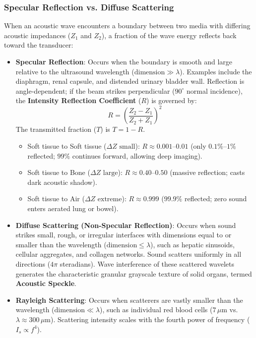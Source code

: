 \documentclass[11pt,a4paper]{article}
\begin{document}
\subsubsection{Specular Reflection vs. Diffuse Scattering}
When an acoustic wave encounters a boundary between two media with differing acoustic impedances ($Z_1$ and $Z_2$), a fraction of the wave energy reflects back toward the transducer:
\begin{itemize}[leftmargin=*]
    \item \textbf{Specular Reflection}: Occurs when the boundary is smooth and large relative to the ultrasound wavelength ($\text{dimension} \gg \lambda$). Examples include the diaphragm, renal capsule, and distended urinary bladder wall. Reflection is angle-dependent; if the beam strikes perpendicular ($90^\circ$ normal incidence), the \textbf{Intensity Reflection Coefficient} ($R$) is governed by:
    \begin{equation}
        R = \left(\frac{Z_2 - Z_1}{Z_2 + Z_1}\right)^2
    \end{equation}
    The transmitted fraction ($T$) is $T = 1 - R$.
    \begin{itemize}
        \item Soft tissue to Soft tissue ($\Delta Z \text{ small}$): $R \approx 0.001\text{--}0.01$ (only $0.1\%\text{--}1\%$ reflected; $99\%$ continues forward, allowing deep imaging).
        \item Soft tissue to Bone ($\Delta Z \text{ large}$): $R \approx 0.40\text{--}0.50$ (massive reflection; casts dark acoustic shadow).
        \item Soft tissue to Air ($\Delta Z \text{ extreme}$): $R \approx 0.999$ ($99.9\%$ reflected; zero sound enters aerated lung or bowel).
    \end{itemize}
    \item \textbf{Diffuse Scattering (Non-Specular Reflection)}: Occurs when sound strikes small, rough, or irregular interfaces with dimensions equal to or smaller than the wavelength ($\text{dimension} \le \lambda$), such as hepatic sinusoids, cellular aggregates, and collagen networks. Sound scatters uniformly in all directions ($4\pi$ steradians). Wave interference of these scattered wavelets generates the characteristic granular grayscale texture of solid organs, termed \textbf{Acoustic Speckle}.
    \item \textbf{Rayleigh Scattering}: Occurs when scatterers are vastly smaller than the wavelength ($\text{dimension} \ll \lambda$), such as individual red blood cells ($7\,\mu\text{m}$ vs. $\lambda \approx 300\,\mu\text{m}$). Scattering intensity scales with the fourth power of frequency ($I_s \propto f^4$).
\end{itemize}
\end{document}
